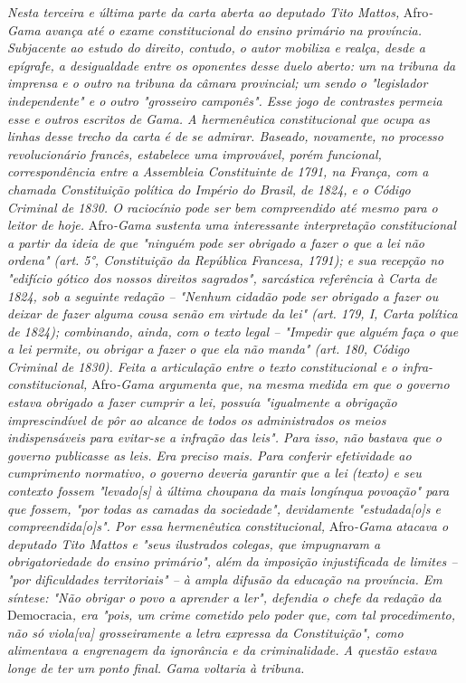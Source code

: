 \emph{Nesta terceira e última parte da carta aberta ao deputado Tito
Mattos,} Afro\emph{-Gama avança até o exame constitucional do ensino
primário na província. Subjacente ao estudo do direito, contudo, o autor
mobiliza e realça, desde a epígrafe, a desigualdade entre os oponentes
desse duelo aberto: um na tribuna da imprensa e o outro na tribuna da
câmara provincial; um sendo o "legislador independente" e o outro
"grosseiro camponês". Esse jogo de contrastes permeia esse e outros
escritos de Gama. A hermenêutica constitucional que ocupa as linhas
desse trecho da carta é de se admirar. Baseado, novamente, no processo
revolucionário francês, estabelece uma improvável, porém funcional,
correspondência entre a Assembleia Constituinte de 1791, na França, com
a chamada Constituição política do Império do Brasil, de 1824, e o
Código Criminal de 1830. O raciocínio pode ser bem compreendido até
mesmo para o leitor de hoje.} Afro\emph{-Gama sustenta uma interessante
interpretação constitucional a partir da ideia de que "ninguém pode ser
obrigado a fazer o que a lei não ordena" (art. 5°, Constituição da
República Francesa, 1791); e sua recepção no "edifício gótico dos nossos
direitos sagrados", sarcástica referência à Carta de 1824, sob a
seguinte redação -- "Nenhum cidadão pode ser obrigado a fazer ou deixar
de fazer alguma cousa senão em virtude da lei" (art. 179, I, Carta
política de 1824); combinando, ainda, com o texto legal -- "Impedir que
alguém faça o que a lei permite, ou obrigar a fazer o que ela não manda"
(art. 180, Código Criminal de 1830). Feita a articulação entre o texto
constitucional e o infra-constitucional,} Afro\emph{-Gama argumenta que,
na mesma medida em que o governo estava obrigado a fazer cumprir a lei,
possuía "igualmente a obrigação imprescindível de pôr ao alcance de
todos os administrados os meios indispensáveis para evitar-se a infração
das leis". Para isso, não bastava que o governo publicasse as leis. Era
preciso mais. Para conferir efetividade ao cumprimento normativo, o
governo deveria garantir que a lei (texto) e seu contexto fossem
"levado{[}s{]} à última choupana da mais longínqua povoação" para que
fossem, "por todas as camadas da sociedade", devidamente
"estudada{[}o{]}s e compreendida{[}o{]}s". Por essa hermenêutica
constitucional,} Afro\emph{-Gama atacava o deputado Tito Mattos e "seus
ilustrados colegas, que impugnaram a obrigatoriedade do ensino
primário", além da imposição injustificada de limites -- "por
dificuldades territoriais" -- à ampla difusão da educação na província.
Em síntese: "Não obrigar o povo a aprender a ler", defendia o chefe da
redação da} Democracia\emph{, era "pois, um crime cometido pelo poder
que, com tal procedimento, não só viola{[}va{]} grosseiramente a letra
expressa da Constituição", como alimentava a engrenagem da ignorância e
da criminalidade. A questão estava longe de ter um ponto final. Gama
voltaria à tribuna.}

